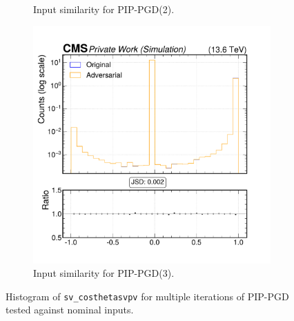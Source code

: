 \begin{figure}[h]
\begin{subfigure}[t]{0.32\textwidth}
    \caption*{Input similarity for PIP-PGD(2).}
  \end{subfigure}\hfill
  \begin{subfigure}[t]{0.32\textwidth}
    \includegraphics[width=\linewidth]{media/output/features/compare/combined_it_3/cmp_vtx_arr_sv_costhetasvpv.pdf}
    \caption*{Input similarity for PIP-PGD(3).}
  \end{subfigure}

  \caption*{Histogram of \texttt{sv\_costhetasvpv} for multiple iterations of PIP-PGD tested against nominal inputs.}
  \label{fig:combined_input_sv_costhetasvpv}
\end{figure}

